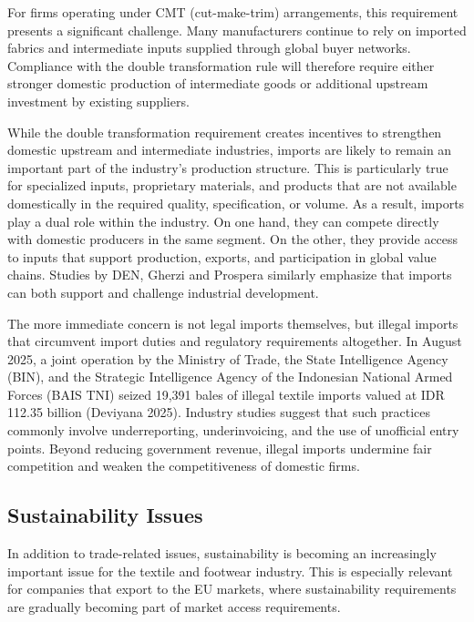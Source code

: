 \documentclass[
  manuscript=article,
  layout=publish,
  year=2026,
  volume=1,
]{den}
\begin{document}
For firms operating under CMT (cut-make-trim) arrangements, this
requirement presents a significant challenge. Many manufacturers
continue to rely on imported fabrics and intermediate inputs supplied
through global buyer networks. Compliance with the double transformation
rule will therefore require either stronger domestic production of
intermediate goods or additional upstream investment by existing
suppliers.

While the double transformation requirement creates incentives to
strengthen domestic upstream and intermediate industries, imports are
likely to remain an important part of the industry's production
structure. This is particularly true for specialized inputs, proprietary
materials, and products that are not available domestically in the
required quality, specification, or volume. As a result, imports play a
dual role within the industry. On one hand, they can compete directly
with domestic producers in the same segment. On the other, they provide
access to inputs that support production, exports, and participation in
global value chains. Studies by DEN, Gherzi and Prospera similarly
emphasize that imports can both support and challenge industrial
development.

The more immediate concern is not legal imports themselves, but illegal
imports that circumvent import duties and regulatory requirements
altogether. In August 2025, a joint operation by the Ministry of Trade,
the State Intelligence Agency (BIN), and the Strategic Intelligence
Agency of the Indonesian National Armed Forces (BAIS TNI) seized 19,391
bales of illegal textile imports valued at IDR 112.35 billion (Deviyana
2025). Industry studies suggest that such practices commonly involve
underreporting, underinvoicing, and the use of unofficial entry points.
Beyond reducing government revenue, illegal imports undermine fair
competition and weaken the competitiveness of domestic firms.

\subsection{Sustainability Issues}\label{sustainability-issues}

In addition to trade-related issues, sustainability is becoming an
increasingly important issue for the textile and footwear industry. This
is especially relevant for companies that export to the EU markets,
where sustainability requirements are gradually becoming part of market
access requirements.
\end{document}
